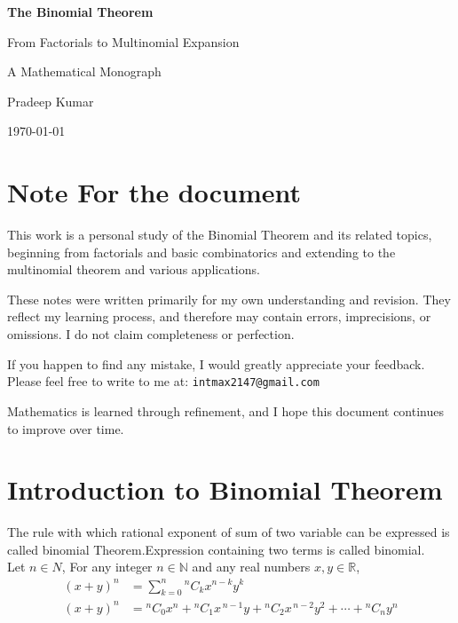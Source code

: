 \documentclass[12pt]{article}
\title{}
\author{}
\date{}
\newcommand{\R}{\mathbb{R}}
\newcommand{\N}{\mathbb{N}}
\begin{document}
\begin{titlepage}
    \centering
    \vspace*{2cm}
    
    {\Huge\bfseries The Binomial Theorem\par}
    \vspace{1cm}
    
    {\Large From Factorials to Multinomial Expansion\par}
    \vspace{2cm}
    
    {\Large A Mathematical Monograph\par}
    \vfill
    
    {\Large Pradeep Kumar\par}
    \vspace{0.5cm}
    
    {\large \today\par}
\end{titlepage}
\section*{Note For the document}
This work is a personal study of the Binomial Theorem and its related topics, 
beginning from factorials and basic combinatorics and extending to the 
multinomial theorem and various applications.

These notes were written primarily for my own understanding and revision. 
They reflect my learning process, and therefore may contain errors, 
imprecisions, or omissions. I do not claim completeness or perfection.

If you happen to find any mistake, I would greatly appreciate your feedback. 
Please feel free to write to me at: \texttt{intmax2147@gmail.com}

Mathematics is learned through refinement, and I hope this document continues 
to improve over time.
\newpage

\newpage

\newpage
\section{Introduction to Binomial Theorem}
The rule with which rational exponent of sum of two variable can be expressed is called binomial Theorem.Expression containing two terms is called binomial.\\
Let $n \in N$, For any integer $n \in \N$ and any real numbers $x, y \in \R$,
\[
\begin{aligned}
(x+y)^n &= \sum_{k=0}^{n} {}^{n}C_{k} x^{n-k} y^k \\[6pt]
(x+y)^n &= {}^{n}C_{0}x^n 
+ {}^{n}C_{1}x^{\,n-1}y 
+ {}^{n}C_{2}x^{\,n-2}y^2 
+ \cdots 
+ {}^{n}C_{n}y^n
\end{aligned}
\]
\end{document}
